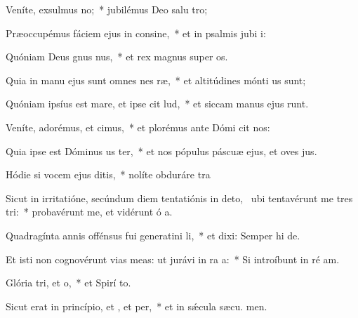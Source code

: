 \item Veníte, exsulmus no;~* jubilémus Deo salu tro;
\item Præoccupémus fáciem ejus in consine,~* et in psalmis jubi i:
\item Quóniam Deus gnus nus,~* et rex magnus super  os.
\item Quia in manu ejus sunt omnes nes ræ,~* et altitúdines mónti us sunt;
\item Quóniam ipsíus est mare, et ipse cit lud,~* et siccam manus ejus runt.
\item Veníte, adorémus, et cimus,~* et plorémus ante Dómi  cit nos:
\item Quia ipse est Dóminus us ter,~* et nos pópulus páscuæ ejus, et oves  jus.
\item Hódie si vocem ejus ditis,~* nolíte obduráre  tra
\item Sicut in irritatióne, secúndum diem tentatiónis in deto,~\pscross{} ubi tentavérunt me tres tri:~* probavérunt me, et vidérunt ó a.
\item Quadragínta annis offénsus fui generatini li,~* et dixi: Semper hi  de.
\item Et isti non cognovérunt vias meas: ut jurávi in ra a:~* Si introíbunt in ré am.
\item Glória tri, et o,~* et Spirí to.
\item Sicut erat in princípio, et , et per,~* et in sǽcula sæcu. men.
